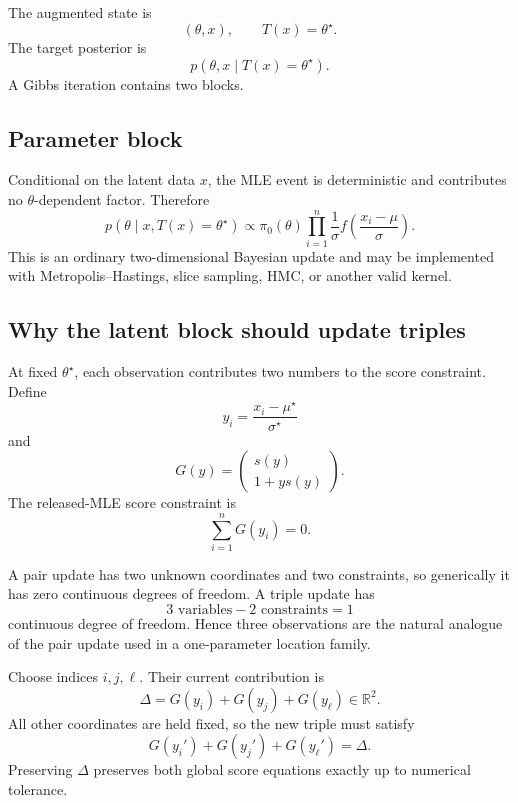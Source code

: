 \documentclass[11pt]{article}
\newcommand{\R}{\mathbb{R}}
\newcommand{\1}{\mathbf{1}}
\begin{document}
The augmented state is
\[
    (\theta,x),\qquad T(x)=\theta^\star.
\]
The target posterior is
\[
    p(\theta,x\mid T(x)=\theta^\star).
\]
A Gibbs iteration contains two blocks.

\subsection{Parameter block}

Conditional on the latent data $x$, the MLE event is deterministic and contributes no $\theta$-dependent factor.  Therefore
\begin{equation}
\boxed{
    p(\theta\mid x,T(x)=\theta^\star)
    \propto
    \pi_0(\theta)
    \prod_{i=1}^n
    \frac{1}{\sigma}
    f\!\left(\frac{x_i-\mu}{\sigma}\right).
}
\end{equation}
This is an ordinary two-dimensional Bayesian update and may be implemented with Metropolis--Hastings, slice sampling, HMC, or another valid kernel.

\subsection{Why the latent block should update triples}

At fixed $\theta^\star$, each observation contributes two numbers to the score constraint.  Define
\[
    y_i=\frac{x_i-\mu^\star}{\sigma^\star}
\]
and
\begin{equation}
\boxed{
    G(y)
    =
    \begin{pmatrix}
        s(y)\\
        1+y s(y)
    \end{pmatrix}.
}
\end{equation}
The released-MLE score constraint is
\[
    \sum_{i=1}^n G(y_i)=0.
\]

A pair update has two unknown coordinates and two constraints, so generically it has zero continuous degrees of freedom.  A triple update has
\[
    3\text{ variables}-2\text{ constraints}=1
\]
continuous degree of freedom.  Hence three observations are the natural analogue of the pair update used in a one-parameter location family.

Choose indices $i,j,\ell$.  Their current contribution is
\begin{equation}
\boxed{
    \Delta
    =G(y_i)+G(y_j)+G(y_\ell)\in\R^2.
}
\end{equation}
All other coordinates are held fixed, so the new triple must satisfy
\begin{equation}
\boxed{
    G(y_i')+G(y_j')+G(y_\ell')=\Delta.
}
\label{eq:triple-constraint}
\end{equation}
Preserving $\Delta$ preserves both global score equations exactly up to numerical tolerance.
\end{document}
